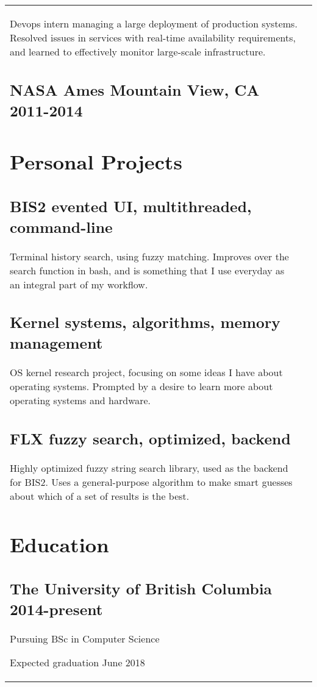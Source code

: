 \documentclass[letterpaper]{article}
\newlength{\leftcol}
\newlength{\rightcol}
\newcommand{\subtitle}{\normalfont\sffamily\color{black}\large}
\begin{document}
\begin{tabularx}{\textwidth}{@{}p{\leftcol} p{\rightcol}}
Devops intern managing a large deployment of production systems. Resolved issues
in services with real-time availability requirements, and learned to effectively
monitor large-scale infrastructure.

\subsection*{NASA Ames \subtitle Mountain View, CA 2011-2014}

\section*{Personal Projects}

\subsection*{BIS2 \subtitle evented UI, multithreaded, command-line}

Terminal history search, using fuzzy matching. Improves over the search function
in bash, and is something that I use everyday as an integral part of my
workflow.

\subsection*{Kernel \subtitle systems, algorithms, memory management}

OS kernel research project, focusing on some ideas I have about operating
systems. Prompted by a desire to learn more about operating systems and
hardware.

\subsection*{FLX \subtitle fuzzy search, optimized, backend}

Highly optimized fuzzy string search library, used as the backend for BIS2. Uses
a general-purpose algorithm to make smart guesses about which of a set of
results is the best.

\section*{Education}

\subsection*{The University of British Columbia \subtitle 2014-present}

Pursuing BSc in Computer Science

Expected graduation June 2018
\end{tabularx}
\end{document}
